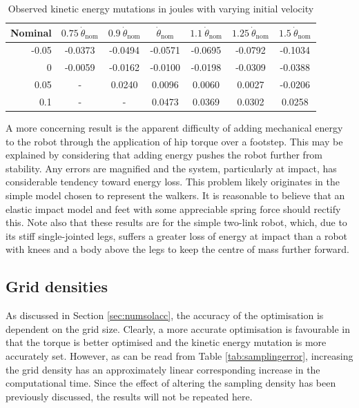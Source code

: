 \begin{table}
	\centering
	\begin{tabular}{ r || c | c | c | c | c | c}
		Nominal & $0.75~\dot{\theta}_{\mathrm{nom}}$ & $0.9~\dot{\theta}_{\mathrm{nom}}$ & $\dot{\theta}_{\mathrm{nom}}$ & $1.1~\dot{\theta}_{\mathrm{nom}}$ & $1.25~\dot{\theta}_{\mathrm{nom}}$ & $1.5~\dot{\theta}_{\mathrm{nom}}$ \\ \hline
		-0.05 & -0.0373 & -0.0494 & -0.0571 & -0.0695 & -0.0792 & -0.1034  \\
		0     & -0.0059 & -0.0162 & -0.0100 & -0.0198 & -0.0309 & -0.0388 \\
		0.05  &    -    &  0.0240 &  0.0096 &  0.0060 &  0.0027 & -0.0206  \\
		0.1   &    -    &    -    &  0.0473 &  0.0369 &  0.0302 &  0.0258
	\end{tabular}
	\caption[Observed kinetic energy mutations with varying initial velocity]{Observed kinetic energy mutations in joules with varying initial velocity}
	\label{tab:vcenergy}
\end{table}

A more concerning result is the apparent difficulty of adding mechanical energy to the robot through the application of hip torque over a footstep. This may be explained by considering that adding energy pushes the robot further from stability. Any errors are magnified and the system, particularly at impact, has considerable tendency toward energy loss. This problem likely originates in the simple model chosen to represent the walkers. It is reasonable to believe that an elastic impact model and feet with some appreciable spring force should rectify this. Note also that these results are for the simple two-link robot, which, due to its stiff single-jointed legs, suffers a greater loss of energy at impact than a robot with knees and a body above the legs to keep the centre of mass further forward.

\subsection{Grid densities}
As discussed in Section \ref{sec:numsolacc}, the accuracy of the optimisation is dependent on the grid size. Clearly, a more accurate optimisation is favourable in that the torque is better optimised and the kinetic energy mutation is more accurately set. However, as can be read from Table \ref{tab:samplingerror}, increasing the grid density has an approximately linear corresponding increase in the computational time. Since the effect of altering the sampling density has been previously discussed, the results will not be repeated here.

